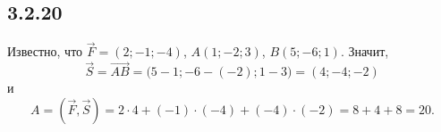 \subsection{3.2.20}

Известно, что $\vec F=(2;-1;-4)$, $A(1;-2;3)$, $B(5;-6;1)$. Значит,
\[
\vec S=\overrightarrow{AB}=\bigl(5-1;-6-(-2);1-3\bigr)=(4;-4;-2)
\]
и
\[
A=\left(\vec F,\vec S\right)=2\cdot4+(-1)\cdot(-4)+(-4)\cdot(-2)=8+4+8=20.
\]